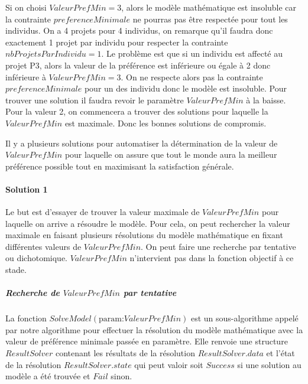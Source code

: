 \documentclass{polytech/polytech}
\begin{document}
Si on choisi $ValeurPrefMin=3$, alors le modèle mathématique est insoluble car la contrainte $preferenceMinimale$ ne pourras pas être respectée pour tout les individus. On a 4 projets pour 4 individus, on remarque qu'il faudra donc exactement 1 projet par individu pour respecter la contrainte $nbProjetsParIndividu=1$. Le problème est que si un individu est affecté au projet P3, alors la valeur de la préférence est inférieure ou égale à 2 donc inférieure à $ValeurPrefMin=3$. On ne respecte alors pas la contrainte $preferenceMinimale$ pour un des individu donc le modèle est insoluble.
Pour trouver une solution il faudra revoir le paramètre $ValeurPrefMin$ à la baisse. Pour la valeur 2, on commencera a trouver des solutions pour laquelle la $ValeurPrefMin$ est maximale. Donc les bonnes solutions de compromis.

Il y a plusieurs solutions pour automatiser la détermination de la valeur de $ValeurPrefMin$ pour laquelle on assure que tout le monde aura la meilleur préférence possible tout en maximisant la satisfaction générale.

\paragraph{Solution 1}
Le but est d'essayer de trouver la valeur maximale de $ValeurPrefMin$ pour laquelle on arrive a résoudre le modèle. Pour cela, on peut rechercher la valeur maximale en faisant plusieurs résolutions du modèle mathématique en fixant différentes valeurs de $ValeurPrefMin$. On peut faire une recherche par tentative ou dichotomique. $ValeurPrefMin$ n'intervient pas dans la fonction objectif à ce stade.

\subparagraph{Recherche de $ValeurPrefMin$ par tentative}

La fonction $SolveModel(\text{param:} ValeurPrefMin)$ est un sous-algorithme appelé par notre algorithme pour effectuer la résolution du modèle mathématique avec la valeur de préférence minimale passée en paramètre.
Elle renvoie une structure $ResultSolver$ contenant les résultats de la résolution $ResultSolver.data$ et l'état de la résolution $ResultSolver.state$ qui peut valoir soit $Success$ si une solution au modèle a été trouvée et $Fail$ sinon.
\end{document}
